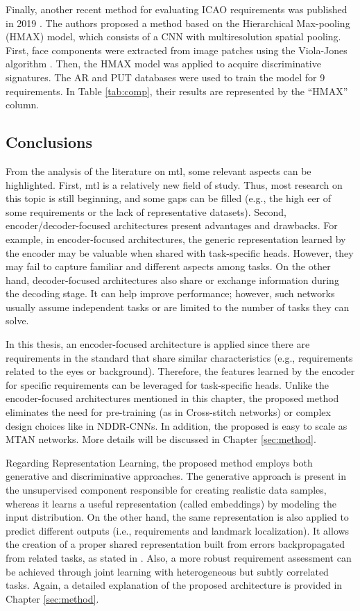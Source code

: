 Finally, another recent method for evaluating ICAO requirements was published in 2019 \citep{nourbakhshfacial}. The authors proposed a method based on the Hierarchical Max-pooling (HMAX) model, which consists of a CNN with multiresolution spatial pooling. First, face components were extracted from image patches using the Viola-Jones algorithm \citep{viola2001rapid}. Then, the HMAX model was applied to acquire discriminative signatures. The AR \citep{martinez1998ar} and PUT \citep{kasinski2008put} databases were used to train the model for 9 requirements. In Table \ref{tab:comp}, their results are represented by the ``HMAX'' column.
 
\subsection{Conclusions}
 
From the analysis of the literature on \acl{mtl}, some relevant aspects can be highlighted. First, \acs{mtl} is a relatively new field of study. Thus, most research on this topic is still beginning, and some gaps can be filled (e.g., the high \acs{eer} of some requirements or the lack of representative datasets). Second, encoder/decoder-focused architectures present advantages and drawbacks. For example, in encoder-focused architectures, the generic representation learned by the encoder may be valuable when shared with task-specific heads. However, they may fail to capture familiar and different aspects among tasks. On the other hand, decoder-focused architectures also share or exchange information during the decoding stage. It can help improve performance; however, such networks usually assume independent tasks or are limited to the number of tasks they can solve. 
 
In this thesis, an encoder-focused architecture is applied since there are requirements in the \icao standard that share similar characteristics (e.g., requirements related to the eyes or background). Therefore, the features learned by the encoder for specific requirements can be leveraged for task-specific heads. Unlike the encoder-focused architectures mentioned in this chapter, the proposed method eliminates the need for pre-training (as in Cross-stitch networks) or complex design choices like in NDDR-CNNs. In addition, the proposed \methodname is easy to scale as MTAN networks. More details will be discussed in Chapter \ref{sec:method}.
 
Regarding Representation Learning, the proposed method employs both generative and discriminative approaches. The generative approach is present in the unsupervised component responsible for creating realistic data samples, whereas it learns a useful representation (called embeddings) by modeling the input distribution. On the other hand, the same representation is also applied to predict different outputs (i.e., requirements and landmark localization). It allows the creation of a proper shared representation built from errors backpropagated from related tasks, as stated in \citep{zhang2014facial}. Also, a more robust requirement assessment can be achieved through joint learning with heterogeneous but subtly correlated tasks. Again, a detailed explanation of the proposed architecture is provided in Chapter \ref{sec:method}.
 
